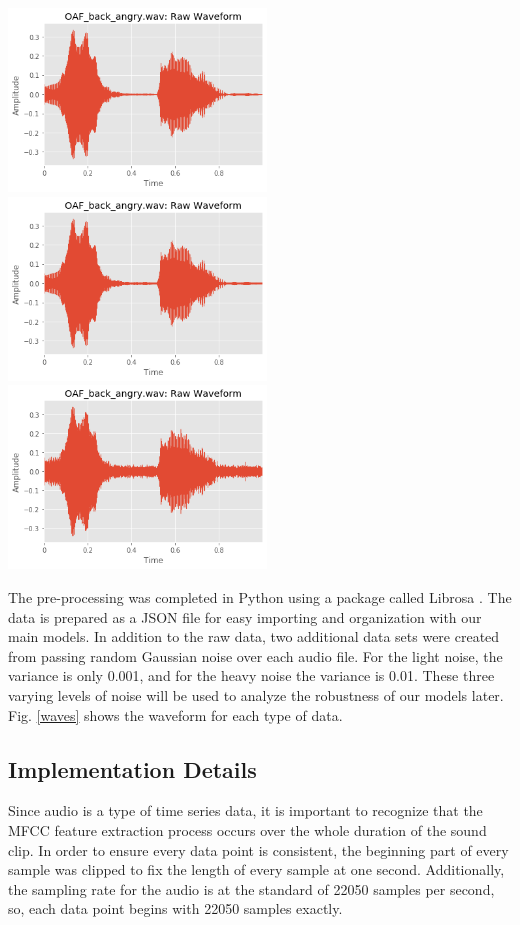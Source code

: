 \documentclass[12pt]{article}
\begin{document}
\begin{multicols*}{2}
{
    \centering
    \includegraphics[width=2.7in]{figures/waveform_no.png}
    \includegraphics[width=2.7in]{figures/waveform_light.png}
    \includegraphics[width=2.7in]{figures/waveform_heavy.png}
    \label{waves}
}

The pre-processing was completed in Python using a package called Librosa \cite{youtube_2020}.
The data is prepared as a JSON file for easy importing and organization with our main models.
In addition to the raw data, two additional data sets were created from passing random Gaussian noise over each audio file.
For the light noise, the variance is only 0.001, and for the heavy noise the variance is 0.01.
These three varying levels of noise will be used to analyze the robustness of our models later.
Fig. \ref{waves} shows the waveform for each type of data.

\subsection*{Implementation Details}
Since audio is a type of time series data, it is important to recognize that the MFCC feature extraction process occurs over the whole duration of the sound clip.
In order to ensure every data point is consistent, the beginning part of every sample was clipped to fix the length of every sample at one second.
Additionally, the sampling rate for the audio is at the standard of 22050 samples per second, so, each data point begins with 22050 samples exactly.


\end{multicols*}
\end{document}
